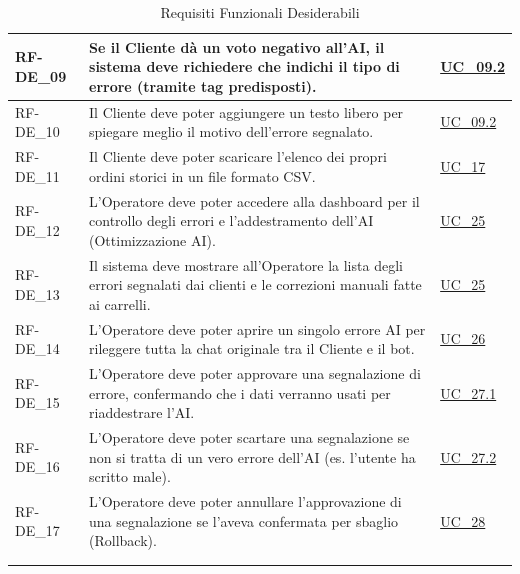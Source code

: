 \begin{longtable}{|>{\raggedright}p{}|>{\raggedright\arraybackslash}p{}|>{\raggedright\arraybackslash}p{}|}
    \hline
    RF-DE\_09 \hypertarget{rf-de_9} & Se il Cliente dà un voto negativo all'AI, il sistema deve richiedere che indichi il tipo di errore (tramite tag predisposti). & \hyperref[uc_09.2]{UC\_09.2} \\
    \hline
    RF-DE\_10 \hypertarget{rf-de_10} & Il Cliente deve poter aggiungere un testo libero per spiegare meglio il motivo dell'errore segnalato. & \hyperref[uc_09.2]{UC\_09.2} \\
    \hline
    RF-DE\_11 \hypertarget{rf-de_11} & Il Cliente deve poter scaricare l'elenco dei propri ordini storici in un file formato CSV. & \hyperref[uc_17]{UC\_17} \\
    \hline
    RF-DE\_12 \hypertarget{rf-de_12} & L'Operatore deve poter accedere alla dashboard per il controllo degli errori e l'addestramento dell'AI (Ottimizzazione AI). & \hyperref[uc_25]{UC\_25} \\
    \hline
    RF-DE\_13 \hypertarget{rf-de_13} & Il sistema deve mostrare all'Operatore la lista degli errori segnalati dai clienti e le correzioni manuali fatte ai carrelli. & \hyperref[uc_25]{UC\_25} \\
    \hline
    RF-DE\_14 \hypertarget{rf-de_14} & L'Operatore deve poter aprire un singolo errore AI per rileggere tutta la chat originale tra il Cliente e il bot. & \hyperref[uc_26]{UC\_26} \\
    \hline
    RF-DE\_15 \hypertarget{rf-de_15} & L'Operatore deve poter approvare una segnalazione di errore, confermando che i dati verranno usati per riaddestrare l'AI. & \hyperref[uc_27.1]{UC\_27.1} \\
    \hline
    RF-DE\_16 \hypertarget{rf-de_16} & L'Operatore deve poter scartare una segnalazione se non si tratta di un vero errore dell'AI (es. l'utente ha scritto male). & \hyperref[uc_27.2]{UC\_27.2} \\
    \hline
    RF-DE\_17 \hypertarget{rf-de_17} & L'Operatore deve poter annullare l'approvazione di una segnalazione se l'aveva confermata per sbaglio (Rollback). & \hyperref[uc_28]{UC\_28} \\
    \hline
    \multicolumn{3}{c}{} \\
    \caption{Requisiti Funzionali Desiderabili}\hypertarget{tab:funzionali_desiderabili}\\
\end{longtable}

